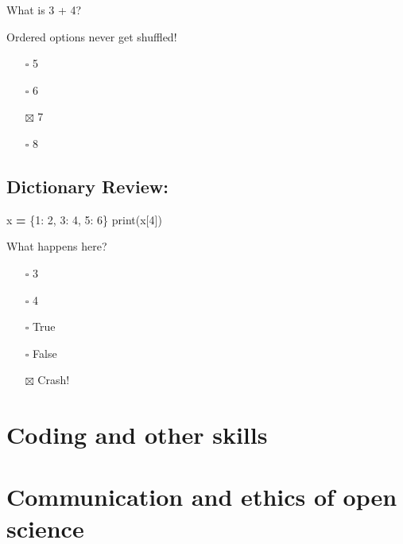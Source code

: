 \documentclass[
]{book}
\newenvironment{Shaded}{\begin{snugshade}}{\end{snugshade}}
\newcommand{\BuiltInTok}[1]{#1}
\newcommand{\DecValTok}[1]{\textcolor[rgb]{0.00,0.00,0.81}{#1}}
\newcommand{\NormalTok}[1]{#1}
\newcommand{\OperatorTok}[1]{\textcolor[rgb]{0.81,0.36,0.00}{\textbf{#1}}}
\providecommand{\tightlist}{%
  \setlength{\itemsep}{0pt}\setlength{\parskip}{0pt}}
\begin{document}
What is 3 + 4?

Ordered options never get shuffled!

\begin{enumerate}
\def\labelenumi{\arabic{enumi}.}
\tightlist
\item[$\square$]
  5
\item[$\square$]
  6
\item[$\boxtimes$]
  7
\item[$\square$]
  8
\end{enumerate}

\hypertarget{dictionary-review}{%
\section{Dictionary Review:}\label{dictionary-review}}

\begin{Shaded}
\begin{Highlighting}[]
\NormalTok{x }\OperatorTok{=}\NormalTok{ \{}\DecValTok{1}\NormalTok{: }\DecValTok{2}\NormalTok{, }\DecValTok{3}\NormalTok{: }\DecValTok{4}\NormalTok{, }\DecValTok{5}\NormalTok{: }\DecValTok{6}\NormalTok{\}}
\BuiltInTok{print}\NormalTok{(x[}\DecValTok{4}\NormalTok{])}
\end{Highlighting}
\end{Shaded}

What happens here?

\begin{itemize}
\tightlist
\item[$\square$]
  3
\item[$\square$]
  4
\item[$\square$]
  True
\item[$\square$]
  False
\item[$\boxtimes$]
  Crash!
\end{itemize}

\hypertarget{coding-and-other-skills}{%
\chapter{Coding and other skills}\label{coding-and-other-skills}}

\hypertarget{communication-and-ethics-of-open-science}{%
\chapter{Communication and ethics of open science}\label{communication-and-ethics-of-open-science}}
\end{document}
